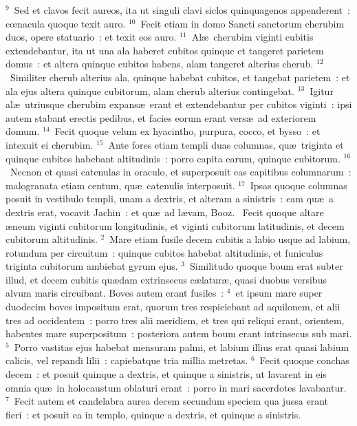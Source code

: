${}^{9}$~Sed et clavos fecit aureos, ita ut singuli clavi siclos quinquagenos appenderent~: cœnacula quoque texit auro.
${}^{10}$~Fecit etiam in domo Sancti sanctorum cherubim duos, opere statuario~: et texit eos auro.
${}^{11}$~Al\ae\ cherubim viginti cubitis extendebantur, ita ut una ala haberet cubitos quinque et tangeret parietem domus~: et altera quinque cubitos habens, alam tangeret alterius cherub.
${}^{12}$~Similiter cherub alterius ala, quinque habebat cubitos, et tangebat parietem~: et ala ejus altera quinque cubitorum, alam cherub alterius contingebat.
${}^{13}$~Igitur al\ae\ utriusque cherubim expans\ae\ erant et extendebantur per cubitos viginti~: ipsi autem stabant erectis pedibus, et facies eorum erant vers\ae\ ad exteriorem domum.
${}^{14}$~Fecit quoque velum ex hyacintho, purpura, cocco, et bysso~: et intexuit ei cherubim.
${}^{15}$~Ante fores etiam templi duas columnas, qu\ae\ triginta et quinque cubitos habebant altitudinis~: porro capita earum, quinque cubitorum.
${}^{16}$~Necnon et quasi catenulas in oraculo, et superposuit eas capitibus columnarum~: malogranata etiam centum, qu\ae\ catenulis interposuit.
${}^{17}$~Ipsas quoque columnas posuit in vestibulo templi, unam a dextris, et alteram a sinistris~: eam qu\ae\ a dextris erat, vocavit Jachin~: et qu\ae\ ad l\ae vam, Booz.
~Fecit quoque altare \ae neum viginti cubitorum longitudinis, et viginti cubitorum latitudinis, et decem cubitorum altitudinis.
${}^{2}$~Mare etiam fusile decem cubitis a labio usque ad labium, rotundum per circuitum~: quinque cubitos habebat altitudinis, et funiculus triginta cubitorum ambiebat gyrum ejus.
${}^{3}$~Similitudo quoque boum erat subter illud, et decem cubitis qu\ae dam extrinsecus c\ae latur\ae , quasi duobus versibus alvum maris circuibant. Boves autem erant fusiles~:
${}^{4}$~et ipsum mare super duodecim boves impositum erat, quorum tres respiciebant ad aquilonem, et alii tres ad occidentem~: porro tres alii meridiem, et tres qui reliqui erant, orientem, habentes mare superpositum~: posteriora autem boum erant intrinsecus sub mari.
${}^{5}$~Porro vastitas ejus habebat mensuram palmi, et labium illius erat quasi labium calicis, vel repandi lilii~: capiebatque tria millia metretas.
${}^{6}$~Fecit quoque conchas decem~: et posuit quinque a dextris, et quinque a sinistris, ut lavarent in eis omnia qu\ae\ in holocaustum oblaturi erant~: porro in mari sacerdotes lavabantur.
${}^{7}$~Fecit autem et candelabra aurea decem secundum speciem qua jussa erant fieri~: et posuit ea in templo, quinque a dextris, et quinque a sinistris.
